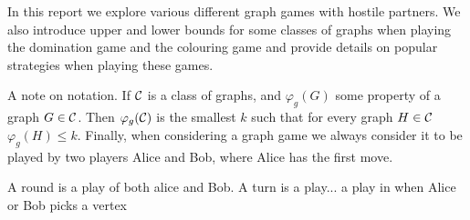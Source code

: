 In this report %
we explore various different graph games with hostile partners. We also introduce upper and lower bounds for some classes of graphs when playing the domination game and the colouring game and provide details on popular strategies when playing these games.






  
    
A note on notation. If $\mathcal{C}$ is a class of graphs, and $\varphi_g(G)$ some property of a graph $G \in \mathcal{C}$. Then $\varphi_g(\mathcal{C})$ is the smallest $k$ such that for every graph $H\in\mathcal{C}$ $\varphi_g(H)\leq k$. Finally, when considering a graph game we always consider it to be played by two players Alice and Bob, where Alice has the first move.  

A round is a play of both alice and Bob. A turn is a play... a play in when Alice or Bob picks a vertex %


    
    
    
    
    
    
    
    
    
    
    
    
    
    
    
    
    
    
    
    
    
